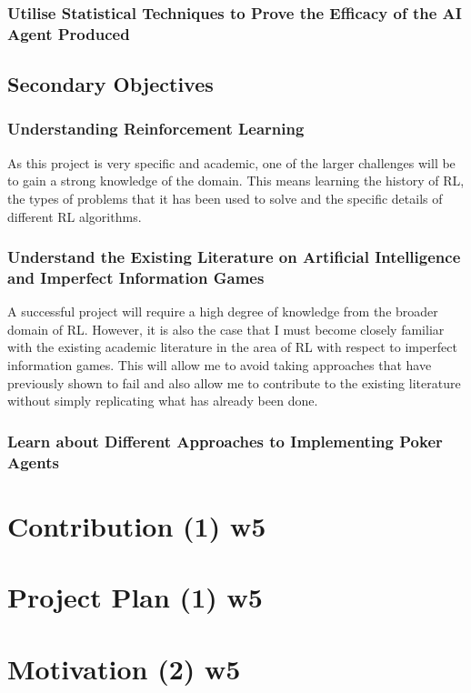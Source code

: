 \subsubsection{Utilise Statistical Techniques to Prove the Efficacy of the AI Agent Produced}

\subsection{Secondary Objectives}
\label{subsec:secondaryObjectives}
\subsubsection{Understanding Reinforcement Learning}
As this project is very specific and academic, one of the larger challenges will be to gain a strong knowledge of the domain.
This means learning the history of RL, the types of problems that it has been used to solve and the specific details of
different RL algorithms.

\subsubsection{Understand the Existing Literature on Artificial Intelligence and Imperfect Information Games}
A successful project will require a high degree of knowledge from the broader domain of RL. However, it is also the case
that I must become closely familiar with the existing academic literature in the area of RL with respect to imperfect
information games.
This will allow me to avoid taking approaches that have previously shown to fail and also allow me to contribute to
the existing literature without simply replicating what has already been done.

\subsubsection{Learn about Different Approaches to Implementing Poker Agents}


\section{Contribution (1) w5}
\label{sec:contribution}


\section{Project Plan (1) w5}
\label{sec:projectPlan}


\section{Motivation (2) w5}
\label{sec:Motivation}